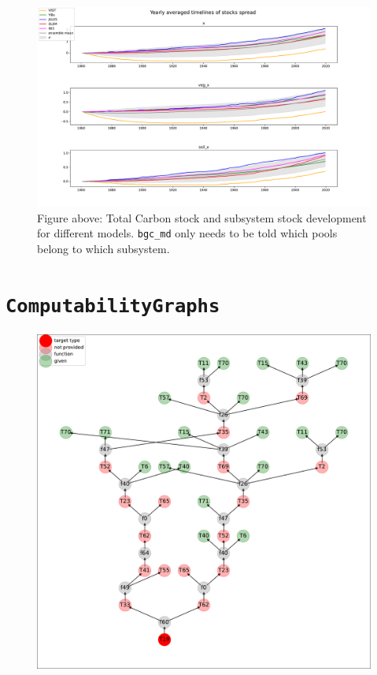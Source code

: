 \documentclass[a4paper]{article}
\newcommand{\ComputabilityGraphs}{\texttt{ComputabilityGraphs}}
\begin{document}
\begin{figure}[t]
	\includegraphics[width=\columnwidth]{test_stock_mean.pdf}
  \caption{
  Figure above: Total Carbon stock and subsystem stock development for different models.
  \texttt{bgc\_md} only needs to be told which pools belong to which subsystem.
  }
\end{figure}  

\section{\ComputabilityGraphs}
\begin{figure}[h]
  \includegraphics[width=\columnwidth]{bak_dep_graph.pdf}

\end{figure}  
\end{document}
